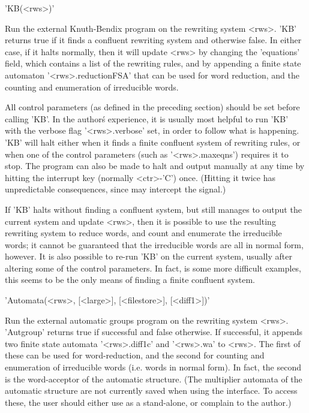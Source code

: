 'KB(<rws>)'

Run the external Knuth-Bendix program  on the rewriting system  <rws>.
'KB'  returns  true  if it  finds   a  confluent rewriting system  and
otherwise false. In either case,  if it halts  normally, then it  will
update <rws> by changing the 'equations'  field, which contains a list
of   the rewriting rules, and by   appending a  finite state automaton
'<rws>.reductionFSA' that  can be  used for  word reduction,  and  the
counting and enumeration of irreducible words.

All control parameters (as defined in the preceding section) should be
set  before calling 'KB'. In the  author\'s experience,  it is usually
most helpful to run 'KB' with the verbose flag '<rws>.verbose' set, in
order   to follow what  is happening.   'KB'  will halt either when it
finds a finite confluent system of rewriting rules, or when one of the
control parameters (such as '<rws>.maxeqns') requires it to stop.  The
program can also  be made to halt and  output manually at any time  by
hitting the interrupt key (normally <ctr>-'C') once. (Hitting it twice
has   unpredictable   consequences, since  {\GAP}    may intercept the
signal.)
	
If 'KB' halts without finding a confluent system, but still manages to
output the current system and update <rws>, then it is possible to use
the  resulting   rewriting system  to  reduce  words,  and  count  and
enumerate   the irreducible words; it  cannot   be guaranteed that the
irreducible words are all in normal form, however. It is also possible
to re-run 'KB'  on the current system,  usually after altering some of
the control parameters. In fact, is some more difficult examples, this
seems to be the only means of finding a finite confluent system.

'Automata(<rws>, [<large>], [<filestore>], [<diff1>])'

Run  the  external automatic groups  program  on  the rewriting system
<rws>.  'Autgroup' returns true if successful and false otherwise.  If
successful, it appends two   finite state automata  '<rws>.diff1c' and
'<rws>.wa'  to   <rws>. The  first    of  these    can  be used    for
word-reduction, and   the   second for counting     and enumeration of
irreducible words (i.e. words in normal  form). In fact, the second is
the word-acceptor of the automatic structure. (The multiplier automata
of  the  automatic structure  are not  currently saved when  using the
{\GAP} interface. To access these, the user should either use {\KBMAG}
as a stand-alone, or complain to the author.)

